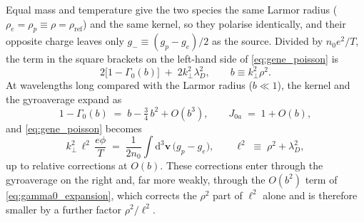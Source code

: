 \documentclass{jpp}
\newcommand{\order}[1]{O\left(#1\right)}
\newcommand{\rmd}{\text{d}}
\newcommand{\bv}{\mathbf{v}}
\newcommand{\kperp}{k_\perp}
\newcommand{\lambdaD}{\lambda_D}
\begin{document}
Equal mass and temperature give the two species the same Larmor radius ($\rho_e = \rho_p \equiv \rho = \rho_\mathrm{ref}$) and the same kernel, so they polarise identically, and their opposite charge leaves only $g_- \equiv (g_p - g_e)/2$ as the source. Divided by $n_0 e^2/T$, the term in the square brackets on the left-hand side of \cref{eq:gene_poisson} is
\begin{equation}\label{eq:pair_response}
2\bigl[1 - \Gamma_0(b)\bigr] \;+\; 2\kperp^2\lambdaD^2,
\qquad b \equiv \kperp^2\rho^2 .
\end{equation}
At wavelengths long compared with the Larmor radius ($b \ll 1$), the kernel and the gyroaverage expand as
\begin{equation}\label{eq:gamma0_expansion}
1 - \Gamma_0(b) \;=\; b - \tfrac{3}{4}\,b^2 + \order{b^3},
\qquad
J_{0a} \;=\; 1 + \order{b},
\end{equation}
and \cref{eq:gene_poisson} becomes
\begin{equation}\label{eq:ell_screening}
\kperp^2\,\ell^2\,\frac{e\phi}{T}
\;=\; \frac{1}{2 n_0}\int \rmd^3\bv\,\bigl(g_p - g_e\bigr),
\qquad
\ell^2 \;\equiv\; \rho^2 + \lambdaD^2 ,
\end{equation}
up to relative corrections at $\order{b}$. These corrections enter through the gyroaverage on the right and, far more weakly, through the $\order{b^2}$ term of \cref{eq:gamma0_expansion}, which corrects the $\rho^2$ part of $\ell^2$ alone and is therefore smaller by a further factor $\rho^2/\ell^2$.
\end{document}
